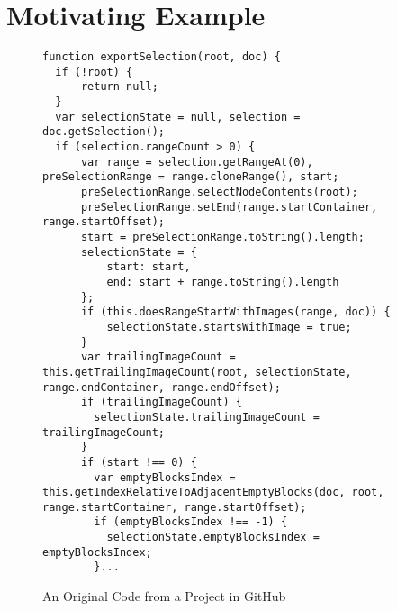 \section{Motivating Example}
\label{example_section}



\begin{figure}[t]
	\centering
	\begin{lstlisting}[]
function exportSelection(root, doc) {
  if (!root) {
      return null;
  }
  var selectionState = null, selection = doc.getSelection();
  if (selection.rangeCount > 0) {
      var range = selection.getRangeAt(0), preSelectionRange = range.cloneRange(), start;
      preSelectionRange.selectNodeContents(root);
      preSelectionRange.setEnd(range.startContainer, range.startOffset);
      start = preSelectionRange.toString().length;
      selectionState = {
          start: start,
          end: start + range.toString().length
      };
      if (this.doesRangeStartWithImages(range, doc)) {
          selectionState.startsWithImage = true;
      }
      var trailingImageCount = this.getTrailingImageCount(root, selectionState, range.endContainer, range.endOffset);
      if (trailingImageCount) {
        selectionState.trailingImageCount = trailingImageCount;
      }
      if (start !== 0) {
        var emptyBlocksIndex = this.getIndexRelativeToAdjacentEmptyBlocks(doc, root, range.startContainer, range.startOffset);
        if (emptyBlocksIndex !== -1) {
          selectionState.emptyBlocksIndex = emptyBlocksIndex;
        }...
        \end{lstlisting}
\vspace{-12pt}
\caption{An Original Code from a Project in GitHub}
\label{example_org}
\end{figure}


